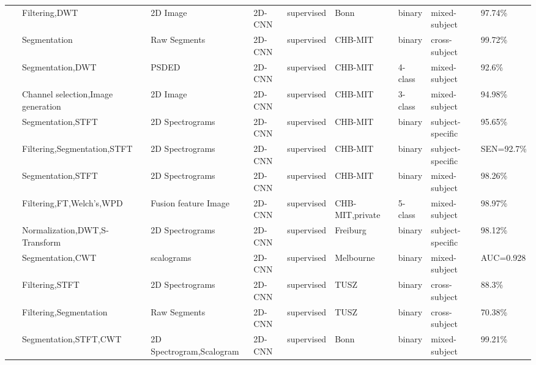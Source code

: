 \begin{table*}[h]
\begin{tabular}{p{0.4cm}p{2.8cm}p{2cm}p{1.5cm}p{1.9cm}p{1.9cm}p{0.8cm}p{1.8cm}p{1.5cm}}
~\cite{Seizure21} & Filtering,DWT & 2D Image & 2D-CNN & supervised & Bonn & binary & mixed-subject & 97.74\% \\
~\cite{Seizure22} & Segmentation & Raw Segments & 2D-CNN & supervised & CHB-MIT & binary & cross-subject & 99.72\% \\
~\cite{Seizure23} & Segmentation,DWT & PSDED & 2D-CNN & supervised & CHB-MIT & 4-class & mixed-subject & 92.6\% \\
~\cite{Seizure24} & Channel selection,\newline Image generation & 2D Image & 2D-CNN & supervised & CHB-MIT & 3-class & mixed-subject & 94.98\% \\
~\cite{Seizure25} & Segmentation,STFT & 2D Spectrograms & 2D-CNN & supervised & CHB-MIT & binary & subject-specific & 95.65\% \\
~\cite{Seizure26} & Filtering,Segmentation,\newline STFT & 2D Spectrograms & 2D-CNN & supervised & CHB-MIT & binary & subject-specific & SEN=92.7\% \\
~\cite{Seizure27} & Segmentation,STFT & 2D Spectrograms & 2D-CNN & supervised & CHB-MIT & binary & mixed-subject & 98.26\% \\
~\cite{Seizure28} & Filtering,FT,Welch’s,WPD & Fusion feature Image & 2D-CNN & supervised & CHB-MIT,\newline private & 5-class & mixed-subject & 98.97\% \\
~\cite{Seizure29} & Normalization,DWT,\newline S-Transform & 2D Spectrograms & 2D-CNN & supervised & Freiburg & binary & subject-specific & 98.12\% \\
~\cite{Seizure30} & Segmentation,CWT & scalograms & 2D-CNN & supervised & Melbourne & binary & mixed-subject & AUC=0.928 \\
~\cite{Seizure31} & Filtering,STFT & 2D Spectrograms & 2D-CNN & supervised & TUSZ & binary & cross-subject & 88.3\% \\
~\cite{Seizure32} & Filtering,Segmentation & Raw Segments & 2D-CNN & supervised & TUSZ & binary & cross-subject & 70.38\% \\
~\cite{Seizure33} & Segmentation,STFT,CWT & 2D Spectrogram,\newline Scalogram & 2D-CNN & supervised & Bonn & binary & mixed-subject & 99.21\% \\
\hline
\end{tabular}
\end{table*}


